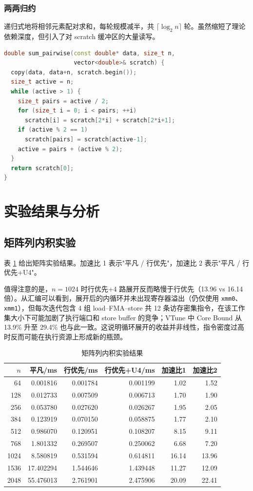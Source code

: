 \documentclass[a4paper,11pt,UTF8]{ctexart}
\begin{document}
\subsubsection{两两归约}
递归式地将相邻元素配对求和，每轮规模减半，共 $\lceil\log_2 n\rceil$ 轮。虽然缩短了理论依赖深度，但引入了对 scratch 缓冲区的大量读写。

\begin{lstlisting}[language=C++,caption=两两归约]
double sum_pairwise(const double* data, size_t n,
                    vector<double>& scratch) {
  copy(data, data+n, scratch.begin());
  size_t active = n;
  while (active > 1) {
    size_t pairs = active / 2;
    for (size_t i = 0; i < pairs; ++i)
      scratch[i] = scratch[2*i] + scratch[2*i+1];
    if (active % 2 == 1)
      scratch[pairs] = scratch[active-1];
    active = pairs + (active % 2);
  }
  return scratch[0];
}
\end{lstlisting}

\section{实验结果与分析}
\subsection{矩阵列内积实验}
表 \ref{tab:matrix} 给出矩阵实验结果。加速比 1 表示"平凡 / 行优先"，加速比 2 表示"平凡 / 行优先+U4"。

值得注意的是，$n=1024$ 时行优先+4 路展开反而略慢于行优先（13.96 vs 16.14 倍）。从汇编可以看到，展开后的内循环并未出现寄存器溢出（仍仅使用 \texttt{xmm0}、\texttt{xmm1}），但每次迭代包含 4 组 load--FMA--store 共 12 条访存密集指令，在该工作集大小下可能加剧了执行端口和 store buffer 的竞争；VTune 中 Core Bound 从 13.9\% 升至 29.4\% 也与此一致。这说明循环展开的收益并非线性，指令密度过高时反而可能在执行资源上形成新的瓶颈。

\begin{table}[H]
  \centering\scriptsize
  \begin{tabular}{rrrrrr}
    \toprule
    $n$ & 平凡/ms & 行优先/ms & 行优先+U4/ms & 加速比1 & 加速比2 \\
    \midrule
    64   & 0.001816 & 0.001784 & 0.001199 & 1.02 & 1.52 \\
    128  & 0.012733 & 0.007509 & 0.006713 & 1.70 & 1.90 \\
    256  & 0.053780 & 0.027620 & 0.026267 & 1.95 & 2.05 \\
    384  & 0.123919 & 0.070150 & 0.058875 & 1.77 & 2.10 \\
    512  & 0.986070 & 0.120951 & 0.108207 & 8.15 & 9.11 \\
    768  & 1.801332 & 0.269507 & 0.250062 & 6.68 & 7.20 \\
    1024 & 8.580819 & 0.531594 & 0.614811 & 16.14 & 13.96 \\
    1536 & 17.402294 & 1.544646 & 1.439448 & 11.27 & 12.09 \\
    2048 & 55.476013 & 2.761901 & 2.475906 & 20.09 & 22.41 \\
    \bottomrule
  \end{tabular}
  \caption{矩阵列内积实验结果}
  \label{tab:matrix}
\end{table}
\end{document}
